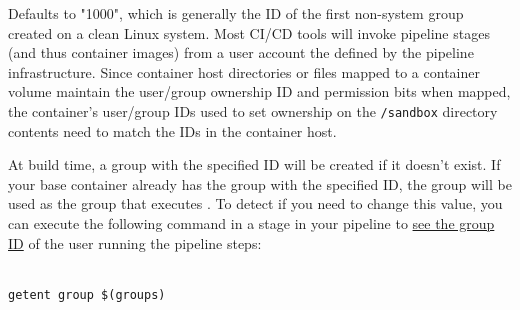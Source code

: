 




Defaults to "1000", which is generally the ID of the first non-system group created on a clean
Linux system.  Most CI/CD tools will invoke pipeline stages (and thus container images) from
a user account the defined by the pipeline infrastructure.  Since container host directories or files
mapped to a container volume maintain the user/group ownership ID and permission bits when mapped, 
the container's user/group IDs used to set ownership on the \texttt{/sandbox} directory contents
need to match the IDs in the container host.

At build time, a group with the specified ID will be created if it doesn't exist.  If your base 
container already has the group with the specified ID, the group will be used as the group that 
executes \scaresolver. To detect if you need to change this value, you can execute the following 
command in a stage in your pipeline to 
\href{https://www.cyberciti.biz/faq/understanding-etcpasswd-file-format/}{see the group ID}
of the user running the pipeline steps:


\noindent\\\texttt{getent group \$(groups)}


